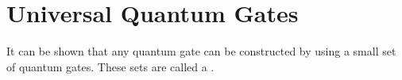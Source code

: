 \section{Universal Quantum Gates}
It can be shown that any quantum gate can be constructed by using a small set of quantum gates.
These sets are called a .

